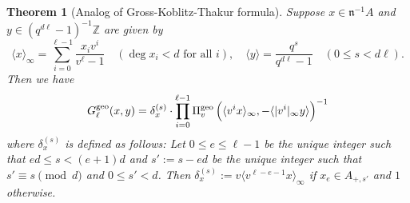 \documentclass[11pt]{amsart}
\theoremstyle{plain}
\newtheorem{thm}{Theorem}[subsection]
\theoremstyle{definition}
\theoremstyle{remark}
\numberwithin{equation}{section}
\newcommand{\ZZ}{\mathbb{Z}}
\newcommand{\nfk}{\mathfrak{n}}
\newcommand{\ang}[1]{\langle #1 \rangle}
\newcommand{\anginf}[1]{\langle #1 \rangle_\infty}
\newcommand{\vgf}{\Pi_v^{\textnormal{geo}}}
\newcommand{\ggs}{G_\l^{\textnormal{geo}}}
\let\l\ell
\begin{document}
	\begin{thm}[Analog of Gross-Koblitz-Thakur formula]      \label{first-gkt-formula}
		Suppose $x \in \nfk^{-1} A$ and $y \in (q^{d\l}-1)^{-1} \ZZ$ are given by
		$$
		\anginf{x} = \sum_{i=0}^{\l-1} \frac{x_i v^i}{v^\l-1}
		\quad
		(\deg x_i < d \text{ for all } i),
		\quad
		\ang{y} = \frac{q^s}{q^{d\l}-1}
		\quad
		(0 \leq s < d\l).
		$$
		Then we have
		$$
		\ggs(x,y)
		= \delta_x^{(s)} \cdot
		\prod_{i=0}^{\l-1} \vgf \left( \anginf{v^ix}, -\ang{|v^i|_\infty y} \right)^{-1}
		$$
		where $\delta_x^{(s)}$ is defined as follows:
		Let $0 \leq e \leq \l-1$ be the unique integer such that $ed \leq s < (e+1)d$ and $s' := s - ed$ be the unique integer such that $s' \equiv s \pmod{d}$ and $0 \leq s' < d$.
		Then $\delta_x^{(s)} := v \anginf{v^{\l-e-1}x}$ if $x_e \in A_{+,s'}$ and $1$ otherwise.
	\end{thm}
	
\end{document}
